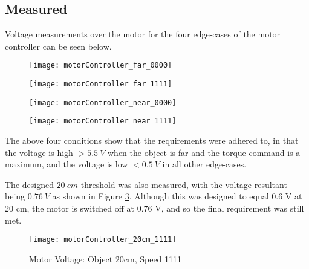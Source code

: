 \subsection{Measured}

Voltage measurements over the motor for the four edge-cases of the motor controller can be seen below.

\begin{figure}[!htb]
    \centering
    \begin{minipage}{.38\textwidth}
        \centering
        \texttt{[image: motorController\_far\_0000]}
        \label{fig:motorController_far_0000}
    \end{minipage}
    \begin{minipage}{.38\textwidth}
        \centering
        \texttt{[image: motorController\_far\_1111]}
        \label{fig:motorController_far_1111}
    \end{minipage}
\end{figure}

\begin{figure}[!htb]
    \centering
    \begin{minipage}{.38\textwidth}
        \centering
        \texttt{[image: motorController\_near\_0000]}
        \label{fig:motorController_near_0000}
    \end{minipage}
    \begin{minipage}{.38\textwidth}
        \centering
        \texttt{[image: motorController\_near\_1111]}
        \label{fig:motorController_near_1111}
    \end{minipage}
\end{figure}

The above four conditions show that the requirements were adhered to, in that the voltage is high $> \SI{5.5}{V}$
when the object is far and the torque command is a maximum, and the voltage is low $< \SI{0.5}{V}$ in all other edge-cases.

The designed $\SI{20}{cm}$ threshold was also measured, with the voltage resultant being $\SI{0.76}{V}$ as shown in Figure \ref{fig:motorController_20cm_1111}.
Although this was designed to equal 0.6 V at 20 cm, the motor is switched off at 0.76 V, and so the final requirement was still met.

\begin{figure}[!htb]
  \centering
  \texttt{[image: motorController\_20cm\_1111]}
  \caption{Motor Voltage: Object 20cm, Speed 1111}
  \label{fig:motorController_20cm_1111}
\end{figure}